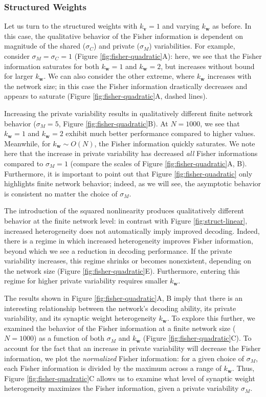 \documentclass[11pt]{article}
\begin{document}
	\subsubsection{Structured Weights}
	Let us turn to the structured weights with $k_{\mathbf{v}}=1$ and varying $k_{\mathbf{w}}$ as before. In this case, the qualitative behavior of the Fisher information is dependent on magnitude of the shared ($\sigma_C$) and private ($\sigma_M$) variabilities. For example, consider $\sigma_M = \sigma_C=1$ (Figure \ref{fig:fisher-quadratic}A): here, we see that the Fisher information saturates for both $k_{\mathbf{w}}=1$ and $k_{\mathbf{w}}=2$, but increases without bound for larger $k_{\mathbf{w}}$. We can also consider the other extreme, where $k_{\mathbf{w}}$ increases with the network size; in this case the Fisher information drastically decreases and  appears to saturate (Figure \ref{fig:fisher-quadratic}A, dashed lines).
	
	Increasing the private variability results in qualitatively different finite network behavior ($\sigma_M=5$, Figure \ref{fig:fisher-quadratic}B). At $N=1000$, we see that $k_{\mathbf{w}}=1$ and $k_{\mathbf{w}}=2$ exhibit much better performance compared to higher values. Meanwhile, for $k_{\mathbf{w}} \sim O(N)$, the Fisher information quickly saturates. We note here that the increase in private variability has decreased \textit{all} Fisher informations compared to $\sigma_M=1$ (compare the scales of Figure \ref{fig:fisher-quadratic}A, B). Furthermore, it is important to point out that Figure \ref{fig:fisher-quadratic} only highlights finite network behavior; indeed, as we will see, the asymptotic behavior is consistent no matter the choice of $\sigma_M$.
	
	The introduction of the squared nonlinearity produces qualitatively different behavior at the finite network level: in contrast with Figure \ref{fig:struct-linear}, increased heterogeneity does not automatically imply improved decoding. Indeed, there is a regime in which increased heterogeneity improves Fisher information, beyond which we see a reduction in decoding performance. If the private variability increases, this regime shrinks or becomes nonexistent, depending on the network size (Figure \ref{fig:fisher-quadratic}E). Furthermore, entering this regime for higher private variability requires smaller $k_{\mathbf{w}}$. 
	
	The results shown in Figure \ref{fig:fisher-quadratic}A, B imply that there is an interesting relationship between the network's decoding ability, its private variability, and its synaptic weight heterogeneity $k_{\mathbf{w}}$. To explore this further, we examined the behavior of the Fisher information at a finite network size ($N=1000$) as a function of both $\sigma_M$ and $k_{\mathbf{w}}$ (Figure \ref{fig:fisher-quadratic}C).  To account for the fact that an increase in private variability will decrease the Fisher information, we plot the \textit{normalized} Fisher information: for a given choice of $\sigma_M$, each Fisher information is divided by the maximum across a range of $k_{\mathbf{w}}$. Thus, Figure \ref{fig:fisher-quadratic}C allows us to examine what level of synaptic weight heterogeneity maximizes the Fisher information, given a private variability $\sigma_M$.
	
\end{document}
